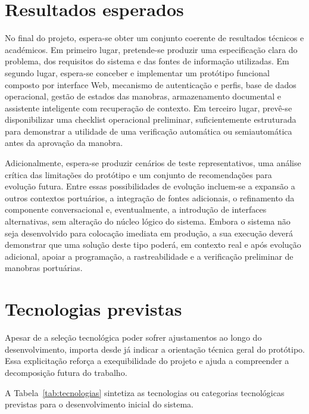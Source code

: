 \documentclass[a4paper,12pt]{report}
\begin{document}
\section{Resultados esperados}

No final do projeto, espera-se obter um conjunto coerente de resultados técnicos e académicos. Em primeiro lugar, pretende-se produzir uma especificação clara do problema, dos requisitos do sistema e das fontes de informação utilizadas. Em segundo lugar, espera-se conceber e implementar um protótipo funcional composto por interface Web, mecanismo de autenticação e perfis, base de dados operacional, gestão de estados das manobras, armazenamento documental e assistente inteligente com recuperação de contexto. Em terceiro lugar, prevê-se disponibilizar uma checklist operacional preliminar, suficientemente estruturada para demonstrar a utilidade de uma verificação automática ou semiautomática antes da aprovação da manobra.

Adicionalmente, espera-se produzir cenários de teste representativos, uma análise crítica das limitações do protótipo e um conjunto de recomendações para evolução futura. Entre essas possibilidades de evolução incluem-se a expansão a outros contextos portuários, a integração de fontes adicionais, o refinamento da componente conversacional e, eventualmente, a introdução de interfaces alternativas, sem alteração do núcleo lógico do sistema. Embora o sistema não seja desenvolvido para colocação imediata em produção, a sua execução deverá demonstrar que uma solução deste tipo poderá, em contexto real e após evolução adicional, apoiar a programação, a rastreabilidade e a verificação preliminar de manobras portuárias.

\section{Tecnologias previstas}

Apesar de a seleção tecnológica poder sofrer ajustamentos ao longo do desenvolvimento, importa desde já indicar a orientação técnica geral do protótipo. Essa explicitação reforça a exequibilidade do projeto e ajuda a compreender a decomposição futura do trabalho.

A Tabela~\ref{tab:tecnologias} sintetiza as tecnologias ou categorias tecnológicas previstas para o desenvolvimento inicial do sistema.
\end{document}
